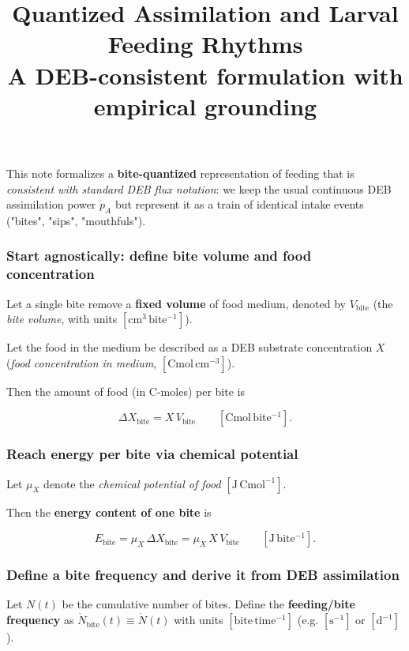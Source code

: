 \documentclass[11pt]{article}
\title{Quantized Assimilation and Larval Feeding Rhythms\\
\large A DEB-consistent formulation with empirical grounding}
\author{}
\date{}
\begin{document}
\maketitle

This note formalizes a \textbf{bite-quantized} representation of feeding that is \textit{consistent with standard DEB flux notation}: we keep the usual continuous DEB assimilation power \(\dot p_A\) but represent it as a train of identical intake events ("bites", "sips", "mouthfuls").
\subsubsection*{Start agnostically: define bite volume and food concentration}

Let a single bite remove a \textbf{fixed volume} of food medium, denoted by \(V_{\text{bite}}\) (the \textit{bite volume}, with units \([\mathrm{cm^3\,bite^{-1}}]\)).

Let the food in the medium be described as a DEB substrate concentration \(X\) (\textit{food concentration in medium}, \([\mathrm{Cmol\,cm^{-3}}]\)).

Then the amount of food (in C-moles) per bite is

\begin{equation}
\Delta X_{\text{bite}} = X\,V_{\text{bite}}
\qquad [\mathrm{Cmol\,bite^{-1}}].
\end{equation}
\subsubsection*{Reach energy per bite via chemical potential}

Let \(\mu_X\) denote the \textit{chemical potential of food} \([\mathrm{J\,Cmol^{-1}}]\).

Then the \textbf{energy content of one bite} is

\begin{equation}
E_{\text{bite}} = \mu_X\,\Delta X_{\text{bite}}
= \mu_X\,X\,V_{\text{bite}}
\qquad [\mathrm{J\,bite^{-1}}].
\end{equation}

\subsubsection*{Define a bite frequency and derive it from DEB assimilation}

Let \(N(t)\) be the cumulative number of bites. Define the \textbf{feeding/bite frequency} as
\(\dot N_{\text{bite}}(t) \equiv \dot N(t)\) with units \([\mathrm{bite\,time^{-1}}]\) (e.g. \([\mathrm{s^{-1}}]\) or \([\mathrm{d^{-1}}]\)).
\end{document}
